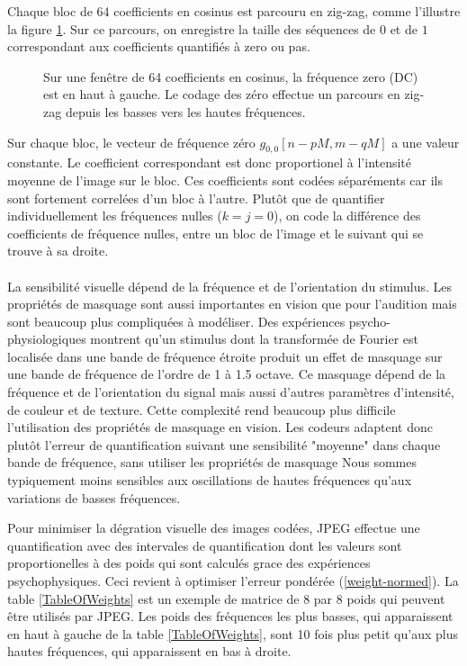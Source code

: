 Chaque bloc de 64 coefficients en cosinus est parcouru en
zig-zag, comme l'illustre la figure \ref{JPEG-zigzag}.
Sur ce parcours, on enregistre la taille des s\'equences
de $0$ et de $1$ correspondant aux coefficients quantifi\'es
\`a zero ou pas. 

\begin{figure}[bhtp]
\centerline{
        \epsfxsize=5cm
	\leavevmode{}}
\caption{Sur une fen\^etre de 64 coefficients en cosinus, la
fr\'equence zero (DC) est en haut \`a gauche. Le codage des
z\'ero effectue un parcours en
zig-zag depuis les basses vers les hautes fr\'equences.}
\label{JPEG-zigzag}
\end{figure}

Sur chaque bloc,
le vecteur de fr\'equence
z\'ero $g_{0,0} [n-pM,m-qM]$ a une valeur constante.
Le coefficient correspondant est donc proportionel \`a 
l'intensit\'e moyenne de l'image sur le bloc.
Ces coefficients sont cod\'ees s\'epar\'ements car 
ils sont fortement
correl\'ees d'un bloc \`a l'autre. Plut\^ot que de quantifier
individuellement les
fr\'equences nulles ($k=j=0$), on code 
la diff\'erence des coefficients de fr\'equence nulles, 
entre un bloc de l'image
et le suivant qui se trouve \`a sa droite.
\\
\\
La sensibilit\'e visuelle d\'epend de la fr\'equence 
et de l'orientation
du stimulus.
Les propri\'et\'es de masquage sont aussi importantes en vision
que pour l'audition mais sont beaucoup plus compliqu\'ees \`a mod\'eliser.
Des exp\'eriences psycho-physiologiques montrent qu'un stimulus
dont la transform\'ee de Fourier est localis\'ee dans une bande
de fr\'equence \'etroite produit un effet de masquage sur une bande
de fr\'equence de l'ordre de 
1 \`a 1.5 octave. Ce masquage d\'epend de la fr\'equence et de 
l'orientation du signal mais aussi d'autres param\`etres
d'intensit\'e, de couleur et de texture.
Cette complexit\'e rend beaucoup plus difficile l'utilisation 
des propri\'et\'es de masquage en vision.
Les codeurs adaptent donc plut\^ot l'erreur de quantification 
suivant 
une sensibilit\'e "moyenne" dans chaque bande de fr\'equence,
sans utiliser les propri\'et\'es de masquage
Nous sommes typiquement moins sensibles aux oscillations de
hautes fr\'equences qu'aux variations de basses fr\'equences.

Pour minimiser la d\'egration visuelle des images cod\'ees,
JPEG effectue une quantification avec des intervales
de quantification dont les valeurs sont proportionelles
\`a des poids qui sont calcul\'es grace des exp\'eriences
psychophysiques.
Ceci revient \`a optimiser l'erreur pond\'er\'ee
(\ref{weight-normed}).
La table \ref{TableOfWeights} est un exemple de matrice
de 8 par 8 poids qui peuvent \^etre utilis\'es par 
JPEG. Les poids des fr\'equences les
plus basses, qui apparaissent en haut \`a gauche de la 
table \ref{TableOfWeights}, sont  10 fois plus petit qu'aux
plus hautes fr\'equences, qui apparaissent en bas \`a droite.

